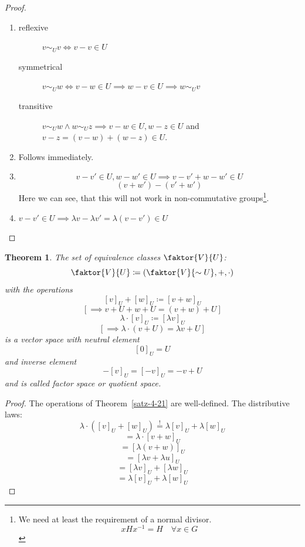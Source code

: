 \documentclass[a4paper,landscape,twocolumn]{article}
\newtheorem{theorem}{Theorem}[section]
\begin{document}
\begin{proof}
  \begin{enumerate}
    \item
      \begin{description}
        \item[reflexive] $v \sim_U v \iff v-v \in U$
        \item[symmetrical] $v \sim_U w \iff v-w \in U \implies w-v \in U \implies w \sim_U v$
        \item[transitive] $v \sim_U w \land w \sim_U z \implies v-w \in U, w - z \in U$
          and $v - z = (v - w) + (w - z) \in U$.
      \end{description}
    \item Follows immediately.
    \item
      \[ v - v' \in U, w - w' \in U \implies v-v'+w-w' \in U \]
      \[ (v+w') - (v'+w') \]
      Here we can see, that this will not work in non-commutative groups\footnote{We need at least the requirement of a normal divisor.
      \[ xHx^{-1} = H \quad\forall x \in G \]}.
    \item $v - v' \in U \implies \lambda v - \lambda v' = \lambda(v - v') \in U$
  \end{enumerate}
\end{proof}

\begin{theorem}
  \label{satz-4-22}
  The set of equivalence classes $\faktor{V}{U}$:
  \[ \faktor{V}{U} \coloneqq \left(\faktor{V}{\sim U}, +, \cdot\right) \]
  with the operations
  \[ [v]_U + [w]_U \coloneqq [v+w]_U \]
  \[ \left[\implies v+U + w+U = (v+w)+U\right] \]
  \[ \lambda\cdot [v]_U \coloneqq [\lambda v]_U \]
  \[ \left[\implies \lambda \cdot (v + U) = \lambda v + U\right] \]
  is a vector space with neutral element
  \[ [0]_U = U \]
  and inverse element
  \[ -[v]_U = [-v]_U = -v + U \]
  and is called \emph{factor space} or \emph{quotient space}.
\end{theorem}
\begin{proof}
  The operations of Theorem~\ref{satz-4-21} are well-defined.
  The distributive laws:
  \[ \lambda \cdot ([v]_U + [w]_U) \stackrel{!}{=} \lambda [v]_U + \lambda [w]_U \]
  \[ = \lambda \cdot [v + w]_U \]
  \[ = [\lambda(v+w)]_U \]
  \[ = [\lambda v + \lambda u]_U \]
  \[ = [\lambda v]_U + [\lambda w]_U \]
  \[ = \lambda[v]_U + \lambda[w]_U \]
\end{proof}
\end{document}
